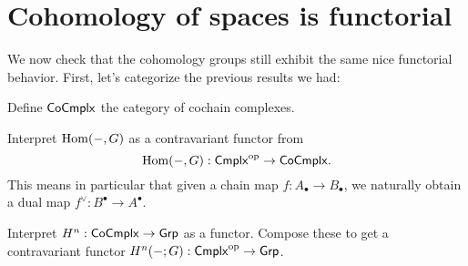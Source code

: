 \section{Cohomology of spaces is functorial}
We now check that the cohomology groups still exhibit the same nice functorial behavior.
First, let's categorize the previous results we had:

\begin{ques}
	Define $\mathsf{CoCmplx}$
	the category of cochain complexes.
\end{ques}

\begin{exercise}
	Interpret $\operatorname{Hom}(-,G)$ as a contravariant functor
	from \[ \operatorname{Hom}(-,G) : \mathsf{Cmplx}^{\mathrm{op}} \to \mathsf{CoCmplx}. \]
	This means in particular that given a chain map $f : A_\bullet \to B_\bullet$,
	we naturally obtain a dual map $f^\vee : B^\bullet \to A^\bullet$.
\end{exercise}

\begin{ques}
	Interpret $H^n : \mathsf{CoCmplx} \to \mathsf{Grp}$ as a functor.
	Compose these to get a contravariant functor
	$H^n(-;G) : \mathsf{Cmplx}^{\mathrm{op}} \to \mathsf{Grp}$.
\end{ques}

